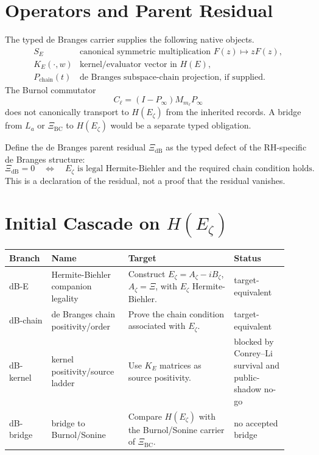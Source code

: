 \documentclass[11pt]{article}
\newcommand{\dB}{\mathrm{dB}}
\newcommand{\XiBC}{\Xi_{\mathrm{BC}}}
\newcommand{\XidB}{\Xi_{\dB}}
\newcommand{\Hzeta}{H(E_\zeta)}
\begin{document}
\section*{Operators and Parent Residual}

The typed de Branges carrier supplies the following native objects.
\[
\begin{array}{ll}
S_E & \text{canonical symmetric multiplication }F(z)\mapsto zF(z),\\
K_E(\cdot,w) & \text{kernel/evaluator vector in }H(E),\\
P_{\mathrm{chain}}(t) & \text{de Branges subspace-chain projection, if supplied.}
\end{array}
\]
The Burnol commutator
\[
C_\ell=(I-P_\infty)M_{m_\ell}P_\infty
\]
does not canonically transport to \(H(E_\zeta)\) from the inherited records.
A bridge from \(L_a\) or \(\XiBC\) to \(\Hzeta\) would be a separate typed
obligation.

Define the de Branges parent residual \(\XidB\) as the typed defect of the
RH-specific de Branges structure:
\[
\XidB=0
\quad\Longleftrightarrow\quad
\text{\(E_\zeta\) is legal Hermite-Biehler and the required chain condition holds.}
\]
This is a declaration of the residual, not a proof that the residual vanishes.

\section*{Initial Cascade on \(H(E_\zeta)\)}

\begin{center}
\begin{tabular}{p{0.13\linewidth}p{0.25\linewidth}p{0.35\linewidth}p{0.18\linewidth}}
\toprule
Branch & Name & Target & Status\\
\midrule
dB-E & Hermite-Biehler companion legality
& Construct \(E_\zeta=A_\zeta-iB_\zeta\), \(A_\zeta=\Xi\), with \(E_\zeta\) Hermite-Biehler.
& target-equivalent\\
dB-chain & de Branges chain positivity/order
& Prove the chain condition associated with \(E_\zeta\).
& target-equivalent\\
dB-kernel & kernel positivity/source ladder
& Use \(K_E\) matrices as source positivity.
& blocked by Conrey--Li survival and public-shadow no-go\\
dB-bridge & bridge to Burnol/Sonine
& Compare \(H(E_\zeta)\) with the Burnol/Sonine carrier of \(\XiBC\).
& no accepted bridge\\
\bottomrule
\end{tabular}
\end{center}
\end{document}
